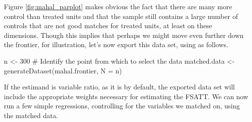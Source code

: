 \documentclass[nojss]{jss}
\begin{document}
Figure \ref{fig:mahal_parplot} makes obvious the fact that there are many more control than 
treated units and that the sample still contains a large number of controls that are
not good matches for treated units, at least on these dimensions. Though this implies that
perhaps we might move even further down the frontier, for illustration, let's now export
this data set, using  as follows.

\begin{CodeChunk}
\begin{CodeInput}
n <- 300 # Identify the point from which to select the data
matched.data <- generateDataset(mahal.frontier, N = n)
\end{CodeInput}
\end{CodeChunk}

If the estimand is variable ratio, as it is by default, the exported
data set will include the appropriate weights necessary for estimating
the FSATT. We can now run a few simple regressions, controlling for
the variables we matched on, using the matched data.
\end{document}

